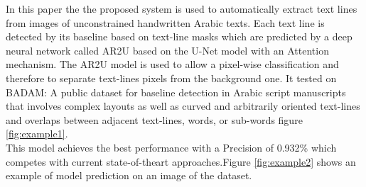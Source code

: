 In this paper \cite{9257759} the
the proposed system is used  to automatically extract text lines from images of unconstrained handwritten Arabic texts. Each text line is detected by its baseline based on text-line masks which are predicted by a deep neural network called \acrshort{AR2U} based on the U-Net model with an Attention mechanism. The \acrshort{AR2U} model is used to allow a pixel-wise classification and therefore to separate text-lines pixels from the background one.
It tested on BADAM: A public dataset for baseline detection in Arabic script manuscripts that involves complex layouts as well as curved and arbitrarily oriented text-lines and overlaps between adjacent text-lines, words, or sub-words figure \ref{fig:example1}.\\ 

This model achieves the best performance with a Precision of 0.932\% which competes with current state-of-theart approaches.Figure \ref{fig:example2} shows an example of model prediction on an image
of the dataset.

